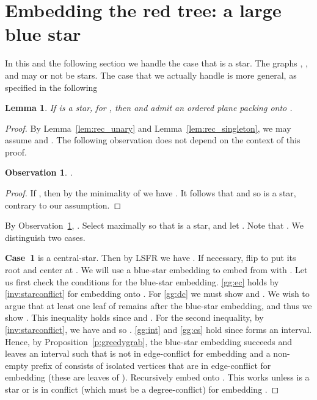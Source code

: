 \documentclass[11pt,a4paper,colorlinks=true,urlcolor=blue,citecolor=red]{article}
\theoremstyle{plain}
\newtheorem{lemma}[theorem]{Lemma}
\newtheorem{observation}[theorem]{Observation}
\newcommand{\case}[1]{\par\vspace{.5\baselineskip}\noindent\textbf{\sffamily Case~#1}}
\begin{document}
\section{Embedding the red tree: a large blue star}
\label{subsec:rec_large_blue_star}
In this and the following section we handle the case that 
is a star. The graphs , , and  may or not be
stars. The case that we actually handle is more general, as specified in
the following
\begin{lemma}\label{lem:rec_large_blue_star}
  If  is a star, for , then  and  admit
  an ordered plane packing onto .
\end{lemma}
\begin{proof}
  By Lemma~\ref{lem:rec_unary} and Lemma~\ref{lem:rec_singleton}, we may
  assume  and . The following observation does
  not depend on the context of this proof.
\begin{observation}\label{obs:rmsize}
    .
  \end{observation}
  \begin{proof}
    If , then by the minimality of  we have . It
    follows that  and so  is a star, contrary to our assumption.
  \end{proof}
By Observation~\ref{obs:rmsize}, . Select  maximally so
  that  is a star, and let . Note that
  . We distinguish two cases.

  \case{1}  is a central-star. Then by LSFR we have
  . If necessary, flip  to put its root and center
  at . We will use a blue-star embedding to embed  from
   with . Let us first check the
  conditions for the blue-star embedding. \ref{gg:ec} holds by
  \ref{inv:starconflict} for embedding  onto . For \ref{gg:dc}
  we must show  and . We wish to
  argue that at least one leaf of  remains after the blue-star
  embedding, and thus we show . This inequality holds
  since  and . For the second inequality, by
  \ref{inv:starconflict}, we have  and so
  . \ref{gg:int} and \ref{gg:cs}
  hold since  forms an interval. Hence, by
  Proposition~\ref{p:greedygrab}, the blue-star embedding succeeds and
  leaves an interval  such that  is not in
  edge-conflict for embedding  and a non-empty prefix of 
  consists of isolated vertices that are in edge-conflict for embedding
   (these are leaves of ). Recursively embed  onto .
  This works unless  is a star or  is in conflict
  (which must be a degree-conflict) for embedding .



\end{proof}
\end{document}
